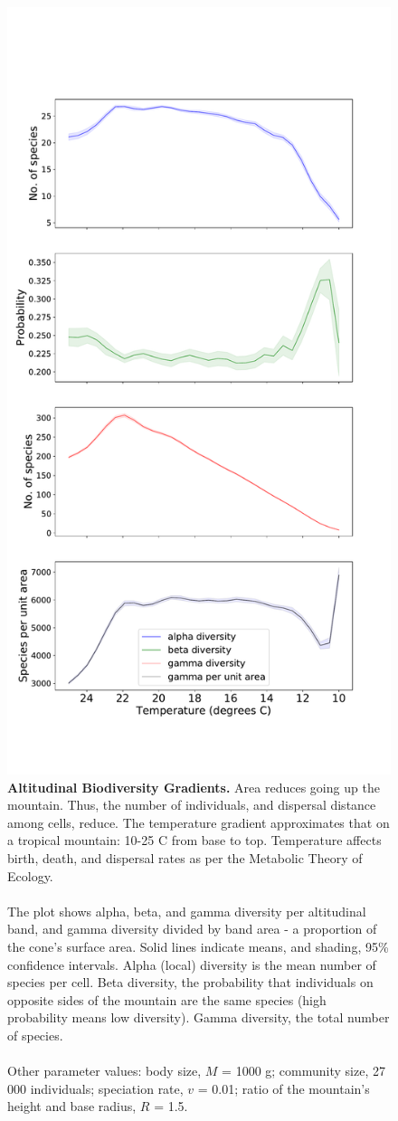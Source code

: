 \documentclass[11pt]{article}
\begin{document}
\begin{figure}[!hbtp]
\vspace*{-3cm}
\centering
	\includegraphics[width=0.6\linewidth]{../Results/DiversityPlots/1000.pdf} %
	\vspace*{-1.5cm}
	\caption{\textbf{Altitudinal Biodiversity Gradients.} Area reduces going up the mountain. Thus, the number of individuals, and dispersal distance among cells, reduce. The temperature gradient approximates that on a tropical mountain: 10-25 \degree C from base to top. Temperature affects birth, death, and dispersal rates as per the Metabolic Theory of Ecology.\\
	\\The plot shows alpha, beta, and gamma diversity per altitudinal band, and gamma diversity divided by band area - a proportion of the cone's surface area. Solid lines indicate means, and shading, 95\% confidence intervals. Alpha (local) diversity is the mean number of species per cell. Beta diversity, the probability that individuals on opposite sides of the mountain are the same species (high probability means low diversity). Gamma diversity, the total number of species.\\
	\\Other parameter values: body size, $M$ = 1000 g; community size, 27 000 individuals; speciation rate, $v$ = 0.01; ratio of the mountain's height and base radius, $R$ = 1.5.}
\label{AltGrad}
\end{figure}
\end{document}
